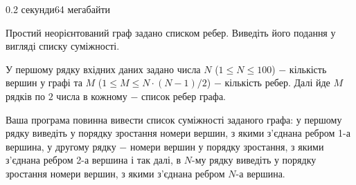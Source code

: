 \begin{problem}{}{}{}{0.2 секунди}{64 мегабайти}

Простий неорієнтований граф задано списком ребер. Виведіть його подання у вигляді списку суміжності.

\InputFile
У першому рядку вхідних даних задано числа $N$ ($1 \le N \le 100$) $-$ кількість вершин у графі та 
$M$ ($1 \le M \le N\cdot(N-1)/2$) $-$ кількість ребер.
Далі йде $M$ рядків по $2$ числа в кожному $-$ список ребер графа. 

\OutputFile
Ваша програма повинна вивести список суміжності заданого графа: у першому рядку виведіть у порядку зростання
номери вершин, з якими з'єднана ребром 1-а вершина, у другому рядку $-$ номери вершин у порядку зростання,
з якими з'єднана ребром 2-а вершина і так далі, в $N$-му рядку виведіть у порядку зростання
номери вершин, з якими з'єднана ребром $N$-а вершина.


\Example

\begin{example}
%
\end{example}

\end{problem}

